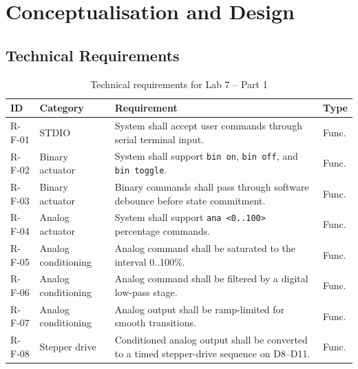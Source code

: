 \documentclass[12pt]{article}
\begin{document}
\section{Conceptualisation and Design}

\subsection{Technical Requirements}

\begin{table}[H]
\centering
\small
\begin{tabular}{p{1.5cm} p{2.6cm} p{7.1cm} p{1.3cm}}
\toprule
\textbf{ID} & \textbf{Category} & \textbf{Requirement} & \textbf{Type} \\
\midrule
R-F-01 & STDIO & System shall accept user commands through serial terminal input. & Func. \\
R-F-02 & Binary actuator & System shall support \texttt{bin on}, \texttt{bin off}, and \texttt{bin toggle}. & Func. \\
R-F-03 & Binary actuator & Binary commands shall pass through software debounce before state commitment. & Func. \\
R-F-04 & Analog actuator & System shall support \texttt{ana <0..100>} percentage commands. & Func. \\
R-F-05 & Analog conditioning & Analog command shall be saturated to the interval 0..100\%. & Func. \\
R-F-06 & Analog conditioning & Analog command shall be filtered by a digital low-pass stage. & Func. \\
R-F-07 & Analog conditioning & Analog output shall be ramp-limited for smooth transitions. & Func. \\
R-F-08 & Stepper drive & Conditioned analog output shall be converted to a timed stepper-drive sequence on D8--D11. & Func. \\
\bottomrule
\end{tabular}
\caption{Technical requirements for Lab 7 -- Part 1}
\label{tab:requirements1}
\end{table}
\end{document}
